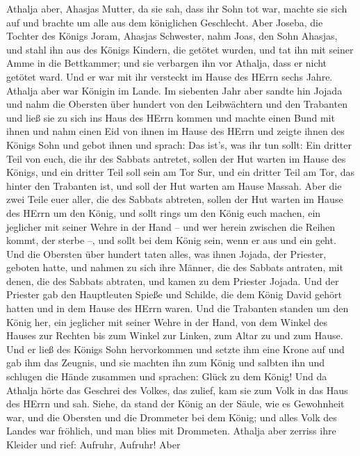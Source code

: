  Athalja aber, Ahasjas Mutter, da sie sah, dass ihr Sohn tot
war, machte sie sich auf und brachte um alle aus dem königlichen
Geschlecht.  Aber Joseba, die Tochter des Königs Joram,
Ahasjas Schwester, nahm Joas, den Sohn Ahasjas, und stahl ihn aus des
Königs Kindern, die getötet wurden, und tat ihn mit seiner Amme in die
Bettkammer; und sie verbargen ihn vor Athalja, dass er nicht getötet
ward.  Und er war mit ihr versteckt im Hause des HErrn sechs
Jahre. Athalja aber war Königin im Lande.  Im siebenten Jahr
aber sandte hin Jojada und nahm die Obersten über hundert von den
Leibwächtern und den Trabanten und ließ sie zu sich ins Haus des HErrn
kommen und machte einen Bund mit ihnen und nahm einen Eid von ihnen im
Hause des HErrn und zeigte ihnen des Königs Sohn  und gebot
ihnen und sprach: Das ist's, was ihr tun sollt: Ein dritter Teil von
euch, die ihr des Sabbats antretet, sollen der Hut warten im Hause des
Königs,  und ein dritter Teil soll sein am Tor Sur, und ein
dritter Teil am Tor, das hinter den Trabanten ist, und soll der Hut
warten am Hause Massah.  Aber die zwei Teile euer aller, die
des Sabbats abtreten, sollen der Hut warten im Hause des HErrn um den
König,  und sollt rings um den König euch machen, ein
jeglicher mit seiner Wehre in der Hand -- und wer herein zwischen die
Reihen kommt, der sterbe --, und sollt bei dem König sein, wenn er aus
und ein geht.  Und die Obersten über hundert taten alles,
was ihnen Jojada, der Priester, geboten hatte, und nahmen zu sich ihre
Männer, die des Sabbats antraten, mit denen, die des Sabbats abtraten,
und kamen zu dem Priester Jojada.  Und der Priester gab den
Hauptleuten Spieße und Schilde, die dem König David gehört hatten und in
dem Hause des HErrn waren.  Und die Trabanten standen um
den König her, ein jeglicher mit seiner Wehre in der Hand, von dem
Winkel des Hauses zur Rechten bis zum Winkel zur Linken, zum Altar zu
und zum Hause.  Und er ließ des Königs Sohn hervorkommen
und setzte ihm eine Krone auf und gab ihm das Zeugnis, und sie machten
ihn zum König und salbten ihn und schlugen die Hände zusammen und
sprachen: Glück zu dem König!  Und da Athalja hörte das
Geschrei des Volkes, das zulief, kam sie zum Volk in das Haus des HErrn
 und sah. Siehe, da stand der König an der Säule, wie es
Gewohnheit war, und die Obersten und die Drommeter bei dem König; und
alles Volk des Landes war fröhlich, und man blies mit Drommeten. Athalja
aber zerriss ihre Kleider und rief: Aufruhr, Aufruhr!  Aber
